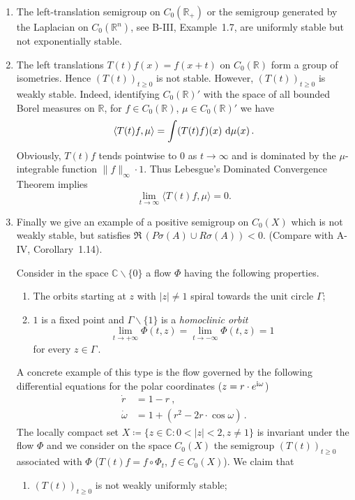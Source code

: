 \begin{example}\label{ex:b4-1.2}
\begin{enumerate}[\upshape (a), wide, labelsep=1em]
\item
The left-translation semigroup on $C_{0}(\mathbb{R}_+)$ or the semigroup generated by the Laplacian on $C_{0}(\mathbb{R}^n)$, see B-III, Example~1.7, are uniformly stable but not exponentially stable.

\item 
The left translations $T(t)f(x) = f(x+t)$ on $C_{0}(\mathbb{R})$ form a group of isometries. 
Hence $(T(t))_{t \geq 0}$ is not stable. 
However, $(T(t))_{t \geq 0}$ is weakly stable. 
Indeed, identifying $C_{0}(\mathbb{R})'$ with the space of all bounded Borel measures on $\mathbb{R}$, for $f \in C_{0}(\mathbb{R})$, $\mu \in C_{0}(\mathbb{R})'$ we have
\[
   \langle T(t)f,\mu \rangle = \int (T(t)f)(x) \, \mathop{}\!\mathrm{d}{\mu}(x)\,.
\]
Obviously, $T(t)f$ tends pointwise to $0$ as $t \to \infty$ and is dominated by the $\mu$-integrable function $\|f\|_\infty \cdot 1$. 
Thus Lebesgue's Dominated Convergence Theorem implies
\[ 
\lim_{t\to\infty} \langle T(t)f,\mu \rangle = 0.
\]

\item 
Finally we give an example of a positive semigroup on $C_{0}(X)$ which is not weakly stable, but satisfies $\Re\,(P\sigma(A) \cup R\sigma(A)) < 0$. (Compare with A-IV, Corollary~1.14).

Consider in the space $\mathbb{C}\backslash\{0\}$ a flow $\Phi$ having the following properties.
\begin{enumerate}[--]
	\item 
	The orbits starting at $z$ with $|z| \neq 1$ spiral towards the unit circle $\Gamma$;
	
	\item 
	$1$ is a fixed point and $\Gamma\backslash\{1\}$ is a \emph{homoclinic orbit} \ie
    \[
    \lim_{t\to+\infty} \Phi(t,z) = \lim_{t\to-\infty} \Phi(t,z) = 1
    \]
    for every $z \in \Gamma$\,.
\end{enumerate}

A concrete example of this type is the flow governed by the following differential equations for the polar coordinates (\ie $z = r\cdot e^{\mathrm{i}\omega}$)
\begin{align*}
   \dot{r} &= 1 - r~,\\
   \dot{\omega} &= 1 + (r^2 - 2r\cdot\cos \omega)\,.
\end{align*}
The locally compact set $X \coloneq
 \{z \in \mathbb{C} \colon 0  <  |z|  <  2, z \neq 1\}$ is invariant under the flow $\Phi$ and we consider on the space $C_{0}(X)$ the semigroup $(T(t))_{t \geq 0}$ associated with $\Phi$ (\ie $T(t)f = f\circ\Phi_t$, $f \in C_{0}(X)$). 
 We claim that
\begin{enumerate}[\upshape (i)]
	\item
	$(T(t))_{t \geq 0}$ is not weakly uniformly stable;
	

\end{enumerate}
\end{enumerate}
\end{example}
